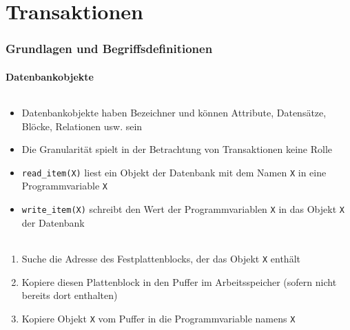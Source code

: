 \part{Transaktionen}

\section{Grundlagen und Begriffsdefinitionen}

\subsection{Datenbankobjekte}
\begin{frame}{\insertsection}
	\framesubtitle{\insertsubsection}
	\begin{itemize}
		\item Datenbankobjekte haben Bezeichner und k\"onnen Attribute, Datens\"atze, Bl\"ocke, Relationen usw. sein
		\item Die Granularität spielt in der Betrachtung von Transaktionen keine Rolle
	\end{itemize}
	\begin{itemize}
		\item \texttt{read\_item(X)} liest ein Objekt der Datenbank mit dem Namen \texttt{X} in eine Programmvariable \texttt{X}
		\item \texttt{write\_item(X)} schreibt den Wert der Programmvariablen \texttt{X} in das Objekt \texttt{X} der Datenbank
	\end{itemize}
\end{frame}

\begin{frame}{\insertsection}
	\framesubtitle{\insertsubsection}
	\begin{enumerate}
		\item Suche die Adresse des Festplattenblocks, der das Objekt \texttt{X} enthält
		\item Kopiere diesen Plattenblock in den Puffer im Arbeitsspeicher (sofern nicht bereits dort enthalten)
		\item Kopiere Objekt \texttt{X} vom Puffer in die Programmvariable namens \texttt{X}
	\end{enumerate}
\end{frame}

